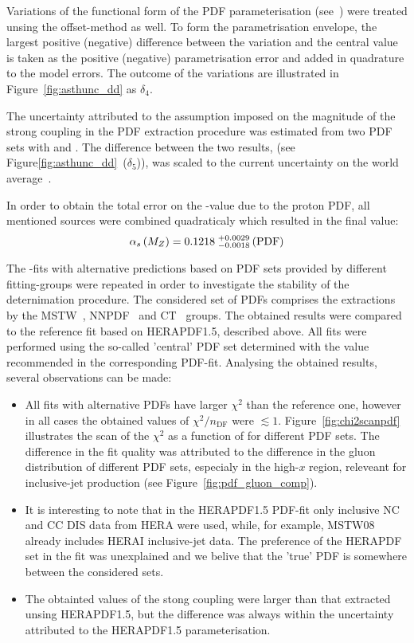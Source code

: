 Variations of the functional form of the PDF parameterisation (see~\cite{herapdf1.5}) were treated unsing the offset-method as well. To form the parametrisation envelope, the largest positive (negative) difference between the variation and the central value is taken as the positive (negative) parametrisation error and added in quadrature to the model errors. The outcome of the variations are illustrated in Figure~\ref{fig:asthunc_dd} as $\delta_4$.

The uncertainty attributed to the assumption imposed on the magnitude of the strong coupling in the PDF extraction procedure was estimated from two PDF sets with  and . The difference between the two results, (see Figure\ref{fig:asthunc_dd}~($\delta_5$)), was scaled to the current uncertainty on the world average~\cite{Bethke:2012jm}.

In order to obtain the total error on the \asz-value due to the proton PDF, all mentioned sources were combined quadraticaly which resulted in the final value:
\begin{equation}
 \mbox{$\alpha_{s}\left(M_{Z}\right)$} = 0.1218\;^{+0.0029}_{-0.0018}\left(\text{PDF}\right)
\end{equation}

The \asz-fits with alternative predictions based on PDF sets provided by different fitting-groups were repeated in order to investigate the stability of the \asz deternimation procedure. The considered set of PDFs comprises the extractions by the MSTW~\cite{}, NNPDF~\cite{} and CT~\cite{} groups. The obtained results were compared to the reference fit based on HERAPDF1.5, described above. All fits were performed using the so-called 'central' PDF set determined with the \asz value recommended in the corresponding PDF-fit. Analysing the obtained results, several observations can be made:
\begin{itemize}
 \item All fits with alternative PDFs have larger $\chi^2$ than the reference one, however in all cases the obtained values of $\chi^2/n_\text{DF}$ were $\lesssim 1$. Figure~\ref{fig:chi2scanpdf} illustrates the scan of the $\chi^2$ as a function of \asz for different PDF sets. The difference in the fit quality was attributed to the difference in the gluon distribution of different PDF sets, especialy in the high-$x$ region, releveant for inclusive-jet production (see Figure~\ref{fig:pdf_gluon_comp}).
 \item It is interesting to note that in the HERAPDF1.5 PDF-fit only inclusive NC and CC DIS data from HERA were used, while, for example, MSTW08 already includes HERAI inclusive-jet data. The preference of the HERAPDF set in the fit was unexplained and we belive that the 'true' PDF is somewhere between the considered sets.
 \item The obtainted values of the stong coupling were larger than that extracted unsing HERAPDF1.5, but the difference was always within the uncertainty attributed to the HERAPDF1.5 parameterisation.  
\end{itemize}

